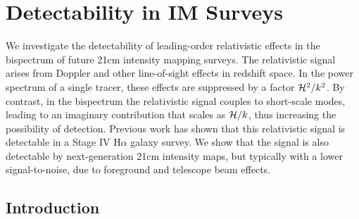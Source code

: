 \chapter{Detectability in IM Surveys}
\label{chapter:snrska}

We investigate the detectability of leading-order relativistic effects in the bispectrum of future 21cm intensity  mapping surveys. The relativistic signal arises from Doppler and other line-of-sight effects in redshift space. In the power spectrum of a single tracer, these effects are suppressed by a factor $\mathcal{H}^2/k^2$. By contrast, in the bispectrum the relativistic signal couples to short-scale modes, leading to
an imaginary contribution that scales as $\mathcal{H}/k$, thus increasing the possibility of detection.
Previous work has shown that this relativistic signal is detectable in a Stage IV H$\alpha$ galaxy survey. 
{We show that the signal is also detectable by next-generation  21cm intensity maps, but typically with a lower signal-to-noise, due to foreground and telescope beam effects.}
%
%
%
%
\section{Introduction}

